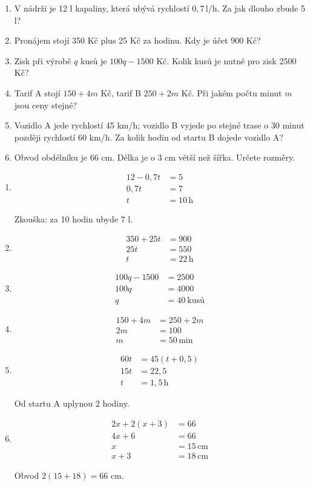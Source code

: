 \documentclass[11pt,a4paper]{article}
\begin{document}
\begin{zadaniReseniBox}[title={Domácí úkol}]
\begin{enumerate}[label=\alph*),itemsep=2pt]
\item V nádrži je 12 l kapaliny, která ubývá rychlostí $0{,}7\,\mathrm{l/h}$. Za jak dlouho zbude 5 l?
\item Pronájem stojí 350 Kč plus 25 Kč za hodinu. Kdy je účet 900 Kč?
\item Zisk při výrobě $q$ kusů je $100q-1500$ Kč. Kolik kusů je nutné pro zisk 2500 Kč?
\item Tarif A stojí $150+4m$ Kč, tarif B $250+2m$ Kč. Při jakém počtu minut $m$ jsou ceny stejné?
\item Vozidlo A jede rychlostí 45 km/h; vozidlo B vyjede po stejné trase o 30 minut později rychlostí 60 km/h. Za kolik hodin od startu B dojede vozidlo A?
\item Obvod obdélníku je 66 cm. Délka je o 3 cm větší než šířka. Určete rozměry.
\end{enumerate}
\tcblower
\begin{enumerate}[label=\alph*),itemsep=1pt]
\item
\[\begin{aligned}
12-0{,}7t&=5 \\
0{,}7t&=7 \\
t&=10\,\mathrm h
\end{aligned}\]\par Zkouška: za 10 hodin ubyde 7 l.
\item
\[\begin{aligned}
350+25t&=900 \\
25t&=550 \\
t&=22\,\mathrm h
\end{aligned}\]
\item
\[\begin{aligned}
100q-1500&=2500 \\
100q&=4000 \\
q&=40\ \text{kusů}
\end{aligned}\]
\item
\[\begin{aligned}
150+4m&=250+2m \\
2m&=100 \\
m&=50\,\mathrm{min}
\end{aligned}\]
\item
\[\begin{aligned}
60t&=45(t+0{,}5) \\
15t&=22{,}5 \\
t&=1{,}5\,\mathrm h
\end{aligned}\]\par Od startu A uplynou 2 hodiny.
\item
\[\begin{aligned}
2x+2(x+3)&=66 \\
4x+6&=66 \\
x&=15\,\mathrm{cm} \\
x+3&=18\,\mathrm{cm}
\end{aligned}\]\par Obvod $2(15+18)=66$ cm.
\end{enumerate}
\end{zadaniReseniBox}
\end{document}
